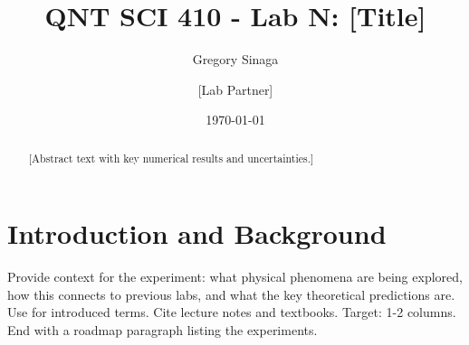 \documentclass[aps,prl,twocolumn,10pt,superscriptaddress]{revtex4-2}
\begin{document}
% 

\title{QNT SCI 410 - Lab N: [Title]}

\author{Gregory Sinaga}

\author{[Lab Partner]}

\date{\today}

\begin{abstract}
[Abstract text with key numerical results and uncertainties.]
\end{abstract}

\maketitle

\section{Introduction and Background}

\begin{guidance}
Provide context for the experiment: what physical phenomena are being explored,
how this connects to previous labs, and what the key theoretical predictions are.
Use \emph{} for introduced terms. Cite lecture notes and textbooks.
Target: 1-2 columns. End with a roadmap paragraph listing the experiments.
\end{guidance}


\end{document}

